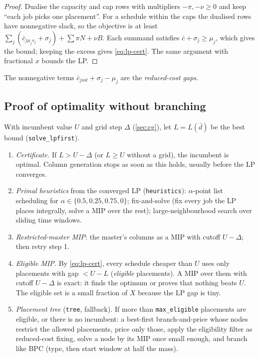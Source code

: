 \documentclass[11pt,a4paper]{article}
\theoremstyle{definition}
\theoremstyle{remark}
\newcommand{\code}[1]{\texttt{#1}}
\newcommand{\rc}{\bar c}
\begin{document}
\begin{proof}
Dualise the capacity and cap rows with multipliers $-\pi,-\nu\ge0$ and keep
``each job picks one placement''. For a schedule within the caps the dualised
rows have nonnegative slack, so the objective is at least
$\sum_j(\rc_{j\mu_js_j}+\sigma_j)+\sum\pi N+\nu B$. Each summand satisfies
$\rc+\sigma_j\ge\mu_j$, which gives the bound; keeping the excess gives
\eqref{eq:lp-cert}. The same argument with fractional $x$ bounds the LP.
\end{proof}

The nonnegative terms $\rc_{jmt}+\sigma_j-\mu_j$ are the \emph{reduced-cost
gaps}.

\subsection{Proof of optimality without branching}
With incumbent value $U$ and grid step $\Delta$ (\cref{sec:cg}), let
$L=L(\bar d)$ be the best bound (\code{solve\_lpfirst}).
\begin{enumerate}[leftmargin=*]
\item \emph{Certificate.} If $L>U-\Delta$ (or $L\ge U$ without a grid), the
  incumbent is optimal. Column generation stops as soon as this holds, usually
  before the LP converges.
\item \emph{Primal heuristics} from the converged LP (\code{heuristics}):
  $\alpha$-point list scheduling for $\alpha\in\{0.5,0.25,0.75,0\}$;
  fix-and-solve (fix every job the LP places integrally, solve a MIP over the
  rest); large-neighbourhood search over sliding time windows.
\item \emph{Restricted-master MIP}: the master's columns as a MIP with cutoff
  $U-\Delta$; then retry step 1.
\item \emph{Eligible MIP.} By \eqref{eq:lp-cert}, every schedule cheaper than
  $U$ uses only placements with gap $<U-L$ (\emph{eligible} placements). A MIP
  over them with cutoff $U-\Delta$ is exact: it finds the optimum or proves
  that nothing beats $U$. The eligible set is a small fraction of $X$ because
  the LP gap is tiny.
\item \emph{Placement tree} (\code{tree}, fallback). If more than
  \code{max\_eligible} placements are eligible, or there is no incumbent: a
  best-first branch-and-price whose nodes restrict the allowed placements,
  price only those, apply the eligibility filter as reduced-cost fixing, solve a
  node by its MIP once small enough, and branch like BPC (type, then start
  window at half the mass).
\end{enumerate}
\end{document}
